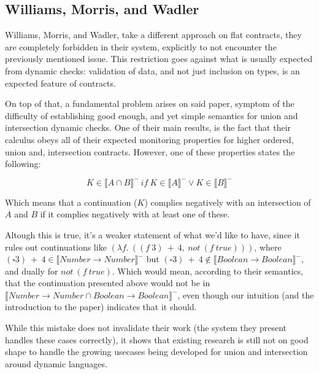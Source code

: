 \documentclass[sigplan,10pt,review,anonymous]{acmart}
\newcommand{\unsure}[2][1=]{}
\begin{document}
\subsection{Williams, Morris, and Wadler}
\label{sec:will-morr-wadl}
\unsure{Subsection title?}

Williams, Morris, and Wadler, take a different approach on flat contracts,
they are completely forbidden in their system, explicitly to not encounter
the previously mentioned issue.
This restriction goes against what is usually expected from dynamic checks:
validation of data, and not just inclusion on types, is an expected
feature of contracts.

On top of that, a fundamental problem arises on said paper,
symptom of the difficulty of establishing good enough, and yet
simple semantics for union and intersection dynamic checks.
One of their main results, is the fact that their calculus obeys
all of their expected monitoring properties for higher ordered, union
and, intersection contracts.
However, one of these properties states the following:

$$ K \in \llbracket A \cap B \rrbracket^-~if~K \in \llbracket A \rrbracket^- \lor K \in \llbracket B \rrbracket^- $$

Which means that a continuation ($K$) complies negatively with an
intersection of $A$ and $B$ if it complies negatively with at least one of these.

Altough this is true, it's a weaker statement of what we'd like to have,
since it rules out continuations like $(\lambda f.~((f~3)~+~4,~not~(f ~ true)))$,
where $(\square 3)~+~4 \in \llbracket Number \rightarrow Number \rrbracket^-$
but $(\square 3)~+~4 \not \in \llbracket Boolean \rightarrow Boolean \rrbracket^-$,
and dually for $not~(f ~ true)$.
Which would mean, according to their semantics, that
the continuation presented above would not
be in $\llbracket Number \rightarrow Number \cap Boolean \rightarrow Boolean \rrbracket^-$,
even though our intuition (and the
introduction to the paper) indicates that it should.


While this mistake does not invalidate their work (the system they present
handles these cases correctly), it shows that existing research is still not on
good shape to handle the growing usecases being developed for
union and intersection around dynamic languages.
\end{document}
